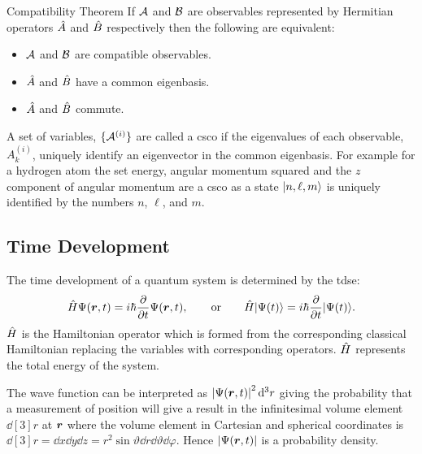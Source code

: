 \begin{theorem}{Compatibility Theorem}{}
    If \(\mathcal{A}\) and \(\mathcal{B}\) are observables represented by Hermitian operators \(\hat{A}\) and \(\hat{B}\) respectively then the following are equivalent:
    \begin{itemize}
        \item \(\mathcal{A}\) and \(\mathcal{B}\) are compatible observables.
        \item \(\hat{A}\) and \(\hat{B}\) have a common eigenbasis.
        \item \(\hat{A}\) and \(\hat{B}\) commute.
    \end{itemize}
\end{theorem}
A set of variables, \(\{\mathcal{A}^{(i)}\}\) are called a \acrfull{csco} if the eigenvalues of each observable, \(A_k^{(i)}\), uniquely identify an eigenvector in the common eigenbasis.
For example for a hydrogen atom the set energy, angular momentum squared and the \(z\) component of angular momentum are a \gls{csco} as a state \(\vert {n, \ell, m} \rangle\) is uniquely identified by the numbers \(n\), \(\ell\), and \(m\).

\subsection{Time Development}
\begin{postulate}{}{}
    The time development of a quantum system is determined by the \gls{tdse}:
    \[\hat{H}\Psi(\bm{r}, t) = i\hbar\pdv{t}\Psi(\bm{r}, t), \qquad\text{or}\qquad \hat{H}\vert {\Psi(t)} \rangle = i\hbar\pdv{t}\vert {\Psi(t)} \rangle.\]
    \(\hat{H}\) is the Hamiltonian operator which is formed from the corresponding classical Hamiltonian replacing the variables with corresponding operators.
    \(\hat{H}\) represents the total energy of the system.
\end{postulate}

The wave function can be interpreted as \(\abs{\Psi(\bm{r}, t)}^2\dd[3]{r}\) giving the probability that a measurement of position will give a result in the infinitesimal volume element \(\dd[3]{r}\) at \(\bm{r}\) where the volume element in Cartesian and spherical coordinates is \(\dd[3]{r} = \dd{x}\dd{y}\dd{z = r^2\sin\vartheta\dd{r}\dd{\vartheta}\dd{\varphi}}\).
Hence \(\abs{\Psi(\bm{r}, t)}\) is a probability density.

